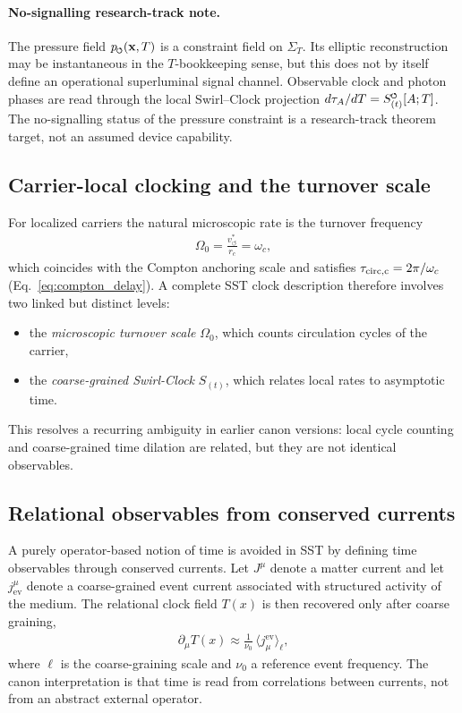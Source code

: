 \documentclass[11pt]{article}
\theoremstyle{definition}
\theoremstyle{plain}
\theoremstyle{remark}
\newcommand{\swirlarrow}{\mathchoice{\mkern-2mu\scriptstyle\boldsymbol{\circlearrowleft}}{\mkern-2mu\scriptstyle\boldsymbol{\circlearrowleft}}{\mkern-2mu\scriptscriptstyle\boldsymbol{\circlearrowleft}}{\mkern-2mu\scriptscriptstyle\boldsymbol{\circlearrowleft}}}
\newcommand{\SwirlClock}{{S_{(t)}^{\swirlarrow}}}
\newcommand{\rc}{{r_c}}
\newcommand{\vchar}{v_{\!\boldsymbol{\circlearrowleft}}^{\ast}}
\begin{document}
        \paragraph{No-signalling research-track note.}
        The pressure field \(p_{\swirlarrow}(\mathbf{x},T)\) is a constraint
        field on \(\Sigma_T\).  Its elliptic reconstruction may be instantaneous
        in the \(T\)-bookkeeping sense, but this does not by itself define an
        operational superluminal signal channel.  Observable clock and photon
        phases are read through the local Swirl--Clock projection
        \(d\tau_A/dT=\SwirlClock[A;T]\).  The no-signalling status of the pressure
        constraint is a research-track theorem target, not an assumed device
        capability.

    \subsection{Carrier-local clocking and the turnover scale}
        For localized carriers the natural microscopic rate is the turnover frequency
        \begin{align}
            \Omega_0 = \frac{\vchar}{\rc} = \omega_c,
        \end{align}
        which coincides with the Compton anchoring scale and satisfies
        \(\tau_{\rm circ,c}=2\pi/\omega_c\) (Eq.~\eqref{eq:compton_delay}).
        A complete SST clock description therefore involves two linked but distinct levels:
        \begin{itemize}
            \item the \emph{microscopic turnover scale} $\Omega_0$, which counts circulation cycles of the carrier,
            \item the \emph{coarse-grained Swirl-Clock} $S_{(t)}$, which relates local rates to asymptotic time.
        \end{itemize}
        This resolves a recurring ambiguity in earlier canon versions: local cycle counting and coarse-grained time dilation are related, but they are not identical observables.

    \subsection{Relational observables from conserved currents}
        A purely operator-based notion of time is avoided in SST by defining time observables through conserved currents. Let $J^\mu$ denote a matter current and let $j_{\mathrm{ev}}^\mu$ denote a coarse-grained event current associated with structured activity of the medium. The relational clock field $T(x)$ is then recovered only after coarse graining,
        \begin{align}
            \partial_\mu T(x) \approx \frac{1}{\nu_0}\,\langle j^{\mathrm{ev}}_\mu \rangle_{\ell},
        \end{align}
        where $\ell$ is the coarse-graining scale and $\nu_0$ a reference event frequency. The canon interpretation is that time is read from correlations between currents, not from an abstract external operator.
\end{document}

